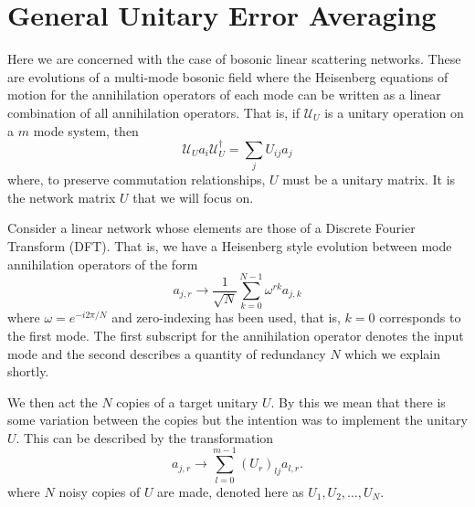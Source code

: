 \documentclass[aps,pra,twocolumn,superscriptaddress,numerical,floatfix]{revtex4-1}
\begin{document}
\section{General Unitary Error Averaging\label{gen case}}

Here we are concerned with the case of bosonic linear scattering networks.  These are evolutions of a multi-mode bosonic field where the Heisenberg equations of motion for the annihilation operators of each mode can be written as a linear combination of all annihilation operators.  That is, if $\mathcal{U}_U$ is a unitary operation on a $m$ mode system, then
\begin{equation}
	\mathcal{U}_U a_i \mathcal{U}_U^\dagger = \sum_j U_{ij} a_j
\end{equation}
where, to preserve commutation relationships, $U$ must be a unitary matrix.  It is the network matrix $U$ that we will focus on.

Consider a linear network whose elements are those of a Discrete Fourier Transform (DFT).  That is, we have a Heisenberg style evolution between mode annihilation operators of the form
\begin{equation}
	a_{j,r} \rightarrow \frac{1}{\sqrt{N}} \sum_{k=0}^{N-1} \omega^{rk} a_{j,k}	
\end{equation}
where $\omega = e^{-i2\pi /N}$ and zero-indexing has been used, that is, $k=0$ corresponds to the first mode. The first subscript for the annihilation operator denotes the input mode and the second describes a quantity of redundancy $N$ which we explain shortly. 

We then act the $N$ copies of a target unitary $U$.  By this we mean that there is some variation between the copies but the intention was to implement the unitary $U$.  This can be described by the transformation
\begin{equation}
	a_{j,r} \rightarrow \sum_{l=0}^{m-1} (U_r)_{lj} a_{l,r}.
\end{equation}
where $N$ noisy copies of $U$ are made, denoted here as $U_1, U_2, \ldots, U_N$. 
\end{document}
